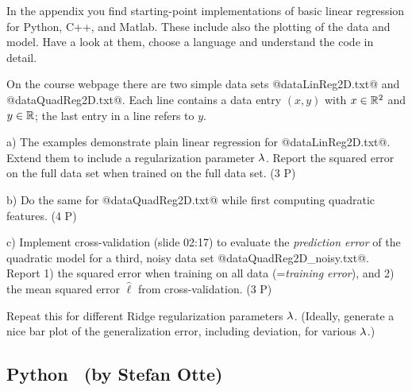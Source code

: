 

\renewcommand{\course}{Machine Learning}
\renewcommand{\exnum}{2}

\exercises


In the appendix you find starting-point implementations of basic
linear regression for Python, C++, and Matlab. These include also the
plotting of the data and model. Have a look at them, choose a language and
understand the code in detail.

On the course webpage there are two simple data sets
@dataLinReg2D.txt@ and @dataQuadReg2D.txt@. Each line contains a data
entry $(x,y)$ with $x\in{\mathbb{R}}^2$ and $y\in{\mathbb{R}}$; the last entry in a
line refers to $y$.

a) The examples demonstrate plain linear regression for
@dataLinReg2D.txt@. Extend them to include a regularization parameter
$\lambda$. Report the squared error on the full data set when trained on
the full data set. (3 P)

b) Do the same for @dataQuadReg2D.txt@ while first computing quadratic
 features. (4 P)

c) Implement cross-validation (slide 02:17) to evaluate the
\emph{prediction error} of the quadratic model for a third, noisy data
set @dataQuadReg2D_noisy.txt@. Report 1) the squared error when
training on all data (=\emph{training error}), and 2) the mean squared
error $\hat\ell$ from cross-validation. (3 P)

Repeat this for different Ridge regularization parameters
$\lambda$. (Ideally, generate a nice bar plot of the generalization error,
including deviation, for various $\lambda$.)



\subsection*{Python~ (by Stefan Otte)}

